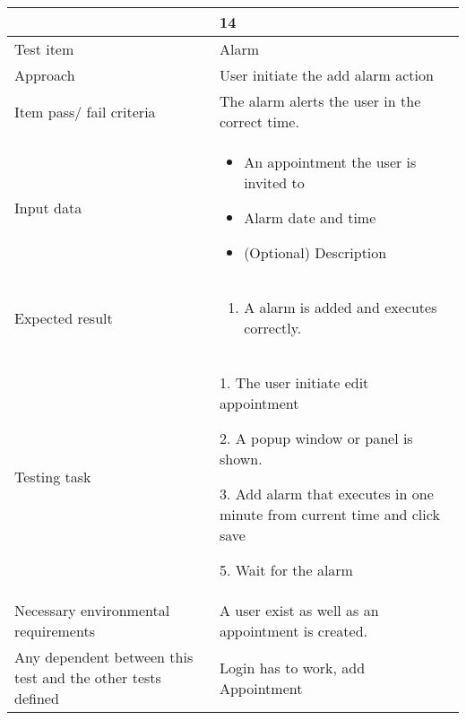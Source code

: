 \documentclass[a4paper, 10pt]{article}
\begin{document}
\begin{tabularx}{\textwidth}{ |X|X| }
\begin{tabularx}{\textwidth}{ |X|X| }
\hline
\rowcolor{Gray}
Test ID & 14 \\ \hline
Test item & Alarm \\ \hline
Approach & User initiate the add alarm action \\ \hline
Item pass/ fail criteria & The alarm alerts the user in the correct time.\\ \hline
Input data & 
\begin{itemize}
	\item An appointment the user is invited to
	\item Alarm date and time
	\item (Optional) Description
\end{itemize}\\ \hline
Expected result & 
\begin{enumerate}
	\item A alarm is added and executes correctly.
\end{enumerate} \\ \hline
Testing task &
\begin{task steps}
	\item 1. The user initiate edit appointment
	\item 2. A popup window or panel is shown. 
	\item 3. Add alarm that executes in one minute from current time and click save
	\item 5. Wait for the alarm
\end{task steps}	\\ \hline
Necessary environmental requirements & A user exist as well as an appointment is created.   \\ \hline
Any dependent between this test and the other tests defined & Login has to work, add Appointment  \\ \hline

\end{tabularx}
\end{document}
